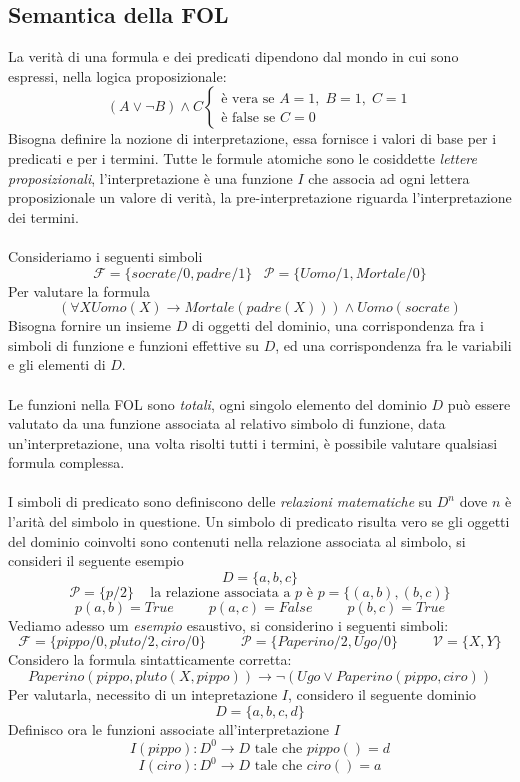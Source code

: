 \documentclass[12pt, letterpaper]{article}
\newcommand{\acc}{\\\hphantom{}\\}
\newcommand{\V}{{\mathcal{V} }}
\newcommand{\F}{{\mathcal{F} }}
\newcommand{\Pred}{{\mathcal{P} }}
\begin{document}
\subsection{Semantica della FOL}
La verità di una formula e dei predicati dipendono dal mondo in cui sono espressi, nella logica proposizionale: 
$$ (A\lor \lnot B)\land C \begin{cases}
    \text{è vera se }A=1,\;B=1,\;C=1\\
    \text{è false se }C=0
\end{cases}$$
Bisogna definire la nozione di interpretazione, essa fornisce i valori di base per i predicati e per i termini. 
Tutte le formule atomiche sono le cosiddette \textit{lettere proposizionali}, l'interpretazione è una funzione 
$I$ che associa ad ogni lettera proposizionale un valore di verità, la pre-interpretazione riguarda l'interpretazione 
dei termini.\acc 
Consideriamo i seguenti simboli 
$$ \F=\{socrate/0,padre/1\}\;\;\;\Pred=\{Uomo/1,Mortale/0\}$$
Per valutare la formula $$ (\forall X Uomo(X)\rightarrow Mortale(padre(X)))\land Uomo(socrate)$$
Bisogna fornire un insieme $D$ di oggetti del dominio, una corrispondenza fra i simboli di funzione e funzioni 
effettive su $D$, ed una corrispondenza fra le variabili e gli elementi di $D$.\acc 
Le funzioni nella FOL sono \textit{totali}, ogni singolo elemento del dominio $D$ può essere valutato da una 
funzione associata al relativo simbolo di funzione, data un'interpretazione, una volta risolti tutti i termini, è 
possibile valutare qualsiasi formula complessa.\acc 
I simboli di predicato sono definiscono delle \textit{relazioni matematiche} su $D^n$ dove $n$ è l'arità del simbolo 
in questione. Un simbolo di predicato risulta vero se gli oggetti del dominio coinvolti sono contenuti nella 
relazione associata al simbolo, si consideri il seguente esempio 
$$ D=\{a,b,c\}$$
$$ \Pred=\{p/2\}\;\;\;\text{ la relazione associata a }p\text{ è }p=\{(a,b),(b,c)\}$$ 
$$ p(a,b)=True\;\;\;\;\;\;\;\;\;p(a,c)=False\;\;\;\;\;\;\;\;\;p(b,c)=True$$
Vediamo adesso um \textit{esempio} esaustivo, si considerino i seguenti simboli: 
$$ \F=\{pippo/0,pluto/2,ciro/0\}\;\;\;\;\;\;\;\;\;\Pred=\{Paperino/2,Ugo/0\}\;\;\;\;\;\;\;\;\;\V=\{X,Y\}$$
Considero la formula sintatticamente corretta: 
$$ Paperino(pippo,pluto(X,pippo))\rightarrow \lnot (Ugo\lor Paperino(pippo,ciro))$$
Per valutarla, necessito di un intepretazione $I$, considero il seguente dominio 
$$ D=\{a,b,c,d\}$$
Definisco ora le funzioni associate all'interpretazione $I$ 
$$ I(pippo) : D^0\rightarrow D\text{ tale che }pippo()=d$$
$$ I(ciro) : D^0\rightarrow D\text{ tale che }ciro()=a$$ 
\end{document}
